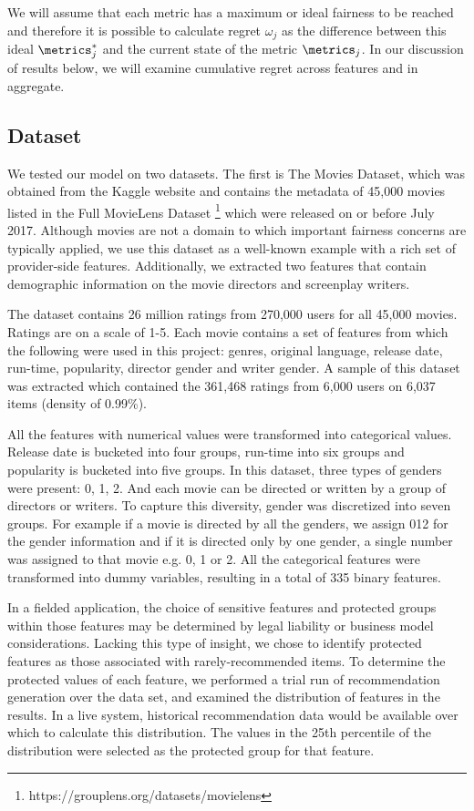 We will assume that each metric has a maximum or ideal fairness to be reached and therefore it is possible to calculate regret $\omega_j$ as the difference between this ideal $\metrics_j^*$ and the current state of the metric $\metrics_j$. In our discussion of results below, we will examine cumulative regret across features and in aggregate. 


\subsection{Dataset}
We tested our model on two datasets. The first is The Movies Dataset, which was obtained from the Kaggle website and contains the metadata of 45,000 movies listed in the Full MovieLens Dataset \footnote{https://grouplens.org/datasets/movielens} which were released on or before July 2017. Although movies are not a domain to which important fairness concerns are typically applied, we use this dataset as a well-known example with a rich set of provider-side features. Additionally, we extracted two features that contain demographic information on the movie directors and screenplay writers.

The dataset contains 26 million ratings from 270,000 users for all 45,000 movies. Ratings are on a scale of 1-5. Each movie contains a set of features from which the following were used in this project: genres, original language, release date, run-time, popularity, director gender and writer gender. A sample of this dataset was extracted which contained the 361,468 ratings from 6,000 users on 6,037 items (density of 0.99\%). 

All the features with numerical values were transformed into categorical values. Release date is bucketed into four groups, run-time into six groups and popularity is bucketed into five groups. In this dataset, three types of genders were present: 0, 1, 2. And each movie can be directed or written by a group of directors or writers. To capture this diversity, gender was discretized into seven groups. For example if a movie is directed by all the genders, we assign 012 for the gender information and if it is directed only by one gender, a single number was assigned to that movie e.g. 0, 1 or 2. All the categorical features were transformed into dummy variables, resulting in a total of 335 binary features.

In a fielded application, the choice of sensitive features and protected groups within those features may be determined by legal liability or business model considerations. Lacking this type of insight, we chose to identify protected features as those associated with rarely-recommended items. To determine the protected values of each feature, we performed a trial run of recommendation generation over the data set, and examined the distribution of features in the results. In a live system, historical recommendation data would be available over which to calculate this distribution. The values in the 25th 
percentile of the distribution were selected as the protected group for that feature.


